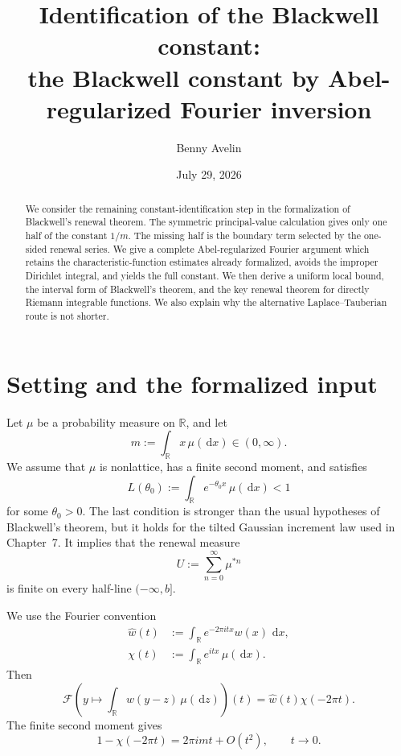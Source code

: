\documentclass[10pt,reqno,a4paper]{amsart}
\title[The Blackwell constant]{Identification of the Blackwell constant:\\
the Blackwell constant by Abel-regularized Fourier inversion}
\author{Benny Avelin}
\date{July 29, 2026}
\numberwithin{equation}{section}
\theoremstyle{plain}
\theoremstyle{definition}
\theoremstyle{remark}
\newcommand{\R}{\mathbb{R}}
\newcommand{\1}{\mathbf{1}}
\newcommand{\de}{\,\mathrm{d}}
\newcommand{\Fourier}{\mathcal{F}}
\begin{document}
\begin{abstract}
  We consider the remaining constant-identification step in the formalization
  of Blackwell's renewal theorem.  The symmetric principal-value calculation
  gives only one half of the constant
  \(1/m\).  The missing half is the boundary term selected by the one-sided
  renewal series.  We give a complete Abel-regularized Fourier argument which
  retains the characteristic-function estimates already formalized, avoids
  the improper Dirichlet integral, and yields the full constant.  We then
  derive a uniform local bound, the interval form of Blackwell's theorem, and
  the key renewal theorem for directly Riemann integrable functions.  We also
  explain why the alternative Laplace--Tauberian route is not shorter.
\end{abstract}

\maketitle

\section{Setting and the formalized input}\label{sec:setting}

Let \(\mu\) be a probability measure on \(\R\), and let
\begin{equation}\label{eq:mean}
  m:=\int_\R x\,\mu(\de x)\in(0,\infty).
\end{equation}
We assume that \(\mu\) is nonlattice, has a finite second moment, and satisfies
\begin{equation}\label{eq:left-exponential}
  L(\theta_0):=\int_\R e^{-\theta_0x}\,\mu(\de x)<1
\end{equation}
for some \(\theta_0>0\).  The last condition is stronger than the usual
hypotheses of Blackwell's theorem, but it holds for the tilted Gaussian
increment law used in Chapter~7.  It implies that the renewal measure
\begin{equation}\label{eq:renewal-measure}
  U:=\sum_{n=0}^{\infty}\mu^{*n}
\end{equation}
is finite on every half-line \((-\infty,b]\).

We use the Fourier convention
\begin{align}
  \widehat w(t)
  &:=
  \int_\R e^{-2\pi itx}w(x)\,\de x, \label{eq:fourier-convention}\\
  \chi(t)
  &:=
  \int_\R e^{itx}\,\mu(\de x). \label{eq:characteristic-function}
\end{align}
Then
\begin{equation}\label{eq:fourier-convolution}
  \Fourier\left(y\mapsto\int_\R w(y-z)\,\mu(\de z)\right)(t)
  =
  \widehat w(t)\chi(-2\pi t).
\end{equation}
The finite second moment gives
\begin{equation}\label{eq:characteristic-expansion}
  1-\chi(-2\pi t)
  =
  2\pi i mt+O(t^2),
  \qquad t\to0.
\end{equation}
\end{document}
